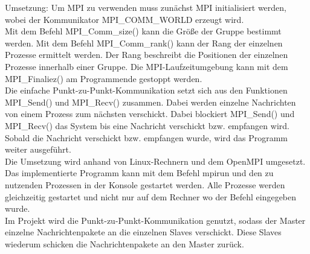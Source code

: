 Umsetzung: Um MPI zu verwenden muss zunächst MPI initialisiert werden, wobei der  Kommunikator MPI\_COMM\_WORLD erzeugt wird. \\
Mit dem Befehl MPI\_Comm\_size() kann die Größe der Gruppe bestimmt werden. Mit dem Befehl MPI\_Comm\_rank() kann der Rang der einzelnen Prozesse ermittelt werden. Der Rang beschreibt die Positionen der einzelnen Prozesse innerhalb einer Gruppe.
Die MPI-Laufzeitumgebung kann mit dem MPI\_Finaliez() am Programmende gestoppt werden.\\
Die einfache Punkt-zu-Punkt-Kommunikation setzt sich aus den Funktionen MPI\_Send() und MPI\_Recv() zusammen. Dabei werden einzelne Nachrichten von einem Prozess zum nächsten verschickt. Dabei blockiert MPI\_Send() und MPI\_Recv() das System bis eine Nachricht verschickt bzw. empfangen wird. Sobald die Nachricht verschickt bzw. empfangen wurde, wird das Programm weiter ausgeführt. \\
Die Umsetzung wird anhand von Linux-Rechnern und dem OpenMPI umgesetzt. Das implementierte Programm kann mit dem Befehl mpirun und den zu nutzenden Prozessen in der Konsole gestartet werden. Alle Prozesse werden gleichzeitig gestartet und nicht nur auf dem Rechner wo der Befehl eingegeben wurde.\\
Im Projekt wird die Punkt-zu-Punkt-Kommunikation genutzt, sodass der Master einzelne Nachrichtenpakete an die einzelnen Slaves verschickt. Diese Slaves wiederum schicken die Nachrichtenpakete an den Master zurück.\cite{b1} \\